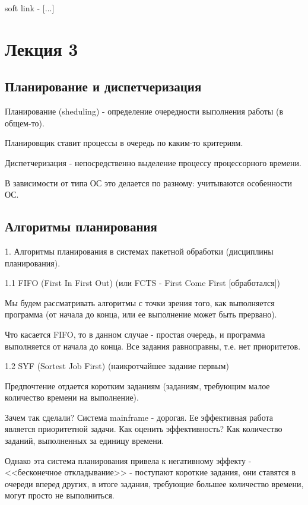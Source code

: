 \documentclass[14pt, a4paper]{article}
\begin{document}
	soft link - [...]
	
	\pagebreak
	
	\section{Лекция 3}
	\subsection{Планирование и диспетчеризация}
	
	Планирование (sheduling) - определение очередности выполнения работы (в общем-то).
	
	Планировщик ставит процессы в очередь по каким-то критериям.
	
	Диспетчеризация - непосредственно выделение процессу процессорного времени.
	
	В зависимости от типа ОС это делается по разному: учитываются особенности ОС.
	
	\subsection{Алгоритмы планирования}
	
	1. Алгоритмы планирования в системах пакетной обработки (дисциплины планирования).
	
	1.1 FIFO (First In First Out) (или FCTS - First Come First [обработался])
	
	Мы будем рассматривать алгоритмы с точки зрения того, как выполняется программа (от начала до конца, или ее выполнение может быть прервано).
	
	Что касается FIFO, то в данном случае - простая очередь, и программа выполняется от начала до конца. Все задания равноправны, т.е. нет приоритетов.
	
	1.2 SYF (Sortest Job First) (наикротчайшее задание первым)
	
	Предпочтение отдается коротким заданиям (заданиям, требующим малое количество времени на выполнение).
	
	Зачем так сделали? Система mainframe - дорогая. Ее эффективная работа является приоритетной задачи. Как оценить эффективность? Как количество заданий, выполненных за единицу времени.
	
	Однако эта система планирования привела к негативному эффекту - <<бесконечное откладывание>> - поступают короткие задания, они ставятся в очереди вперед других, в итоге задания, требующие большее количество времени, могут просто не выполниться.
	
\end{document}
